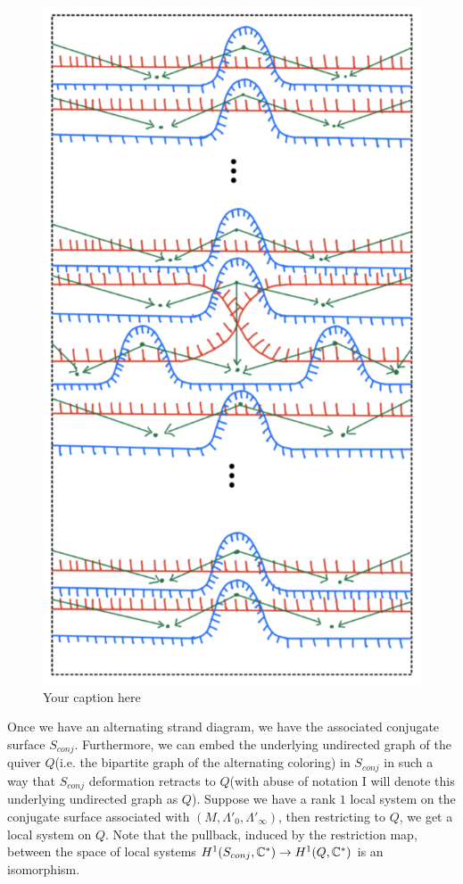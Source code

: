 \begin{figure}[H] 
    \centering
    \includegraphics[scale = 0.95]{diagrams/local_systems_on_as_diagrams/2.png} 
    \caption{Your caption here}
    \label{fig:your-label}
\end{figure}

Once we have an alternating strand diagram, we have the associated conjugate surface $S_{conj}$. Furthermore, we can embed the underlying undirected graph of the quiver $Q$(i.e. the bipartite graph of the alternating coloring) in $S_{conj}$ in such a way that $S_{conj}$ deformation retracts to $Q$(with abuse of notation I will denote this underlying undirected graph as $Q$). Suppose we have a rank $1$ local system on the conjugate surface associated with $(M, \Lambda'_0, \Lambda'_\infty)$, then restricting to $Q$, we get a local system on $Q$. Note that the pullback, induced by the restriction map, between the space of local systems $H^1(S_{conj}, \mathbb{C}^*) \rightarrow  H^1(Q,\mathbb{C}^*)$ is an isomorphism.

